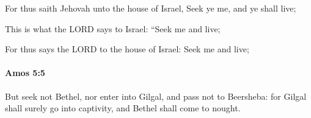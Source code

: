 			\begin{versebox}
					\item[BHS] 
					\item[LXX] 
					\item[ASV] For thus saith Jehovah unto the house of Israel, Seek ye me, and ye shall live;
					\item[NIV] This is what the LORD says to Israel: “Seek me and live;
					\item[NRSV] For thus says the LORD to the house of Israel: Seek me and live;
			\end{versebox}

		\paragraph{Amos 5:5} %
			\label{AMOS-5-5}

			But seek not Bethel, nor enter into Gilgal, and pass not to Beersheba: for Gilgal shall surely go into captivity, and Bethel shall come to nought.

